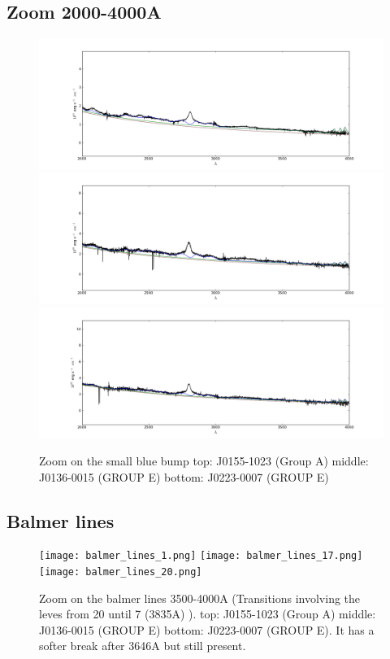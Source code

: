 \documentclass[usenatbib]{mn2e}
\begin{document}
\newpage

\subsection{Zoom 2000-4000A}

\begin{figure}
\begin{center}
\includegraphics[width=0.6\linewidth,angle=0]{mg+fe_1.png}
\vspace{5mm}
\includegraphics[width=0.6\linewidth,angle=0]{mg+fe_17.png}\\
\includegraphics[width=0.6\linewidth,angle=0]{mg+fe_20.png}
\end{center} 
\caption{Zoom  on the small blue bump   top: J0155-1023 (Group A) middle: J0136-0015 (GROUP E) bottom: J0223-0007 (GROUP E) \label{fig:landscape}}   
\end{figure}

\newpage

\subsection{Balmer lines}

\begin{figure}
\begin{center}
\texttt{[image: balmer\_lines\_1.png]}
\vspace{5mm}
\texttt{[image: balmer\_lines\_17.png]}\\
\texttt{[image: balmer\_lines\_20.png]}
\end{center} 
\caption{Zoom on the balmer lines 3500-4000A (Transitions involving  the leves from 20 until 7 (3835A) ).   top: J0155-1023 (Group A) middle: J0136-0015 (GROUP E) bottom: J0223-0007 (GROUP E). It has a softer break after 3646A but still present.   \label{fig:landscape}}   
\end{figure}
\end{document}
